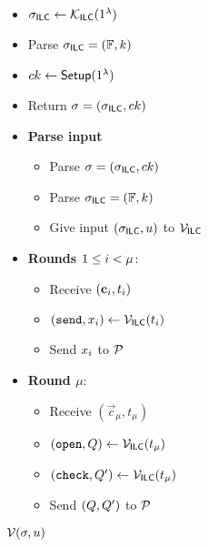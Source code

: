 \begin{figure}[!h]
{\begin{minipage}[t]{10cm}
\begin{algorithm}[H]
\begin{itemize}
\end{itemize} 
\vspace{2.47cm}
\end{algorithm}
\end{minipage}%
\begin{minipage}[t]{6.5cm}
\vspace{0cm}
\begin{algorithm}[H]
\caption*{$\KK(1^\sep)$\vspace{-1pt}}
\begin{itemize}
\item $\mathsf{\sigma}_{\mathsf{ILC}}\gets \mathcal{K}_{\mathsf{ILC}}(1^{\lambda})$
\item Parse $\mathsf{\sigma}_{\mathsf{ILC}}=(\mathbb{F},k)$
\item $ck\gets \mathsf{Setup}(1^{\lambda})$
\item Return $\mathsf{\sigma}=(\mathsf{\sigma}_{\mathsf{ILC}},ck)$
\end{itemize}
\end{algorithm}
\vspace{-30pt}
\begin{algorithm}[H]
\caption*{$\mathcal{V}(\mathsf{\sigma}, u)$}
\begin{itemize} \item \textbf{Parse input} 
\begin{itemize}
\item Parse $\mathsf{\sigma}=(\mathsf{\sigma}_{\mathsf{ILC}},ck)$
\item Parse $\mathsf{\sigma}_{\mathsf{ILC}}=(\mathbb{F},k)$
\item Give input $(\mathsf{\sigma}_{\mathsf{ILC}},u)$ to $\mathcal{V}_{\mathsf{ILC}}$
\end{itemize}
\item \textbf{Rounds $1 \leq i < \mu$}:
\begin{itemize}
\item Receive $(\mathbf{c}_i,t_i)$
\item $(\texttt{send},x_i)\gets \mathcal{V}_{\mathsf{ILC}}(t_i)$
\item Send $x_i$ to $\mathcal{P}$ 
\end{itemize}
\item \textbf{Round $\mu$}: 
\begin{itemize}
\item Receive $(\vec{c}_\mu,t_{\mu})$
\item $(\texttt{open},Q)\gets \mathcal{V}_{\mathsf{ILC}}(t_\mu)$
\item $(\texttt{check},Q')\gets \mathcal{V}_{\mathsf{ILC}}(t_\mu)$
\item Send $(Q,Q')$ to $\mathcal{P}$ 

\end{itemize}
\end{itemize}
\end{algorithm}
\end{minipage}}
\end{figure}
